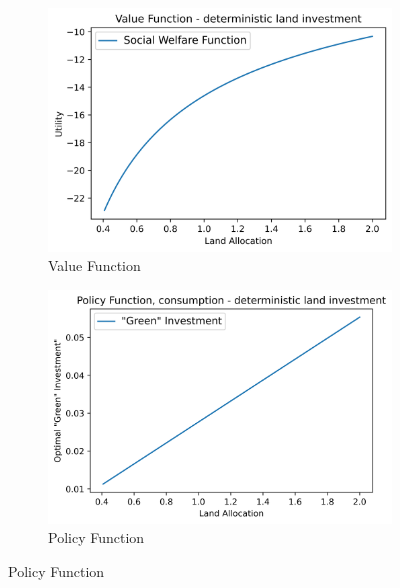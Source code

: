 \documentclass[12pt]{article}
\begin{document}
\begin{figure}[!tbp]
	\caption{Visual Output}
	\begin{subfigure}[b]{0.45\textwidth}
		\includegraphics[width=\textwidth]{PS8_VF.png}
		\caption{Value Function}
	\end{subfigure}
	\hfill
	\begin{subfigure}[b]{0.45\textwidth}
		\includegraphics[width=\textwidth]{PS8_PF.png}
		\caption{Policy Function}
	\end{subfigure}
\end{figure}
\end{document}

